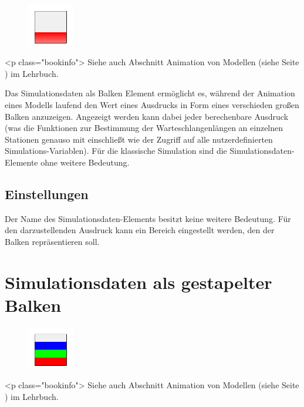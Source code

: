 \begin{figure}
\vspace{-22pt}
\includegraphics[width=2cm]{imageModelElementAnimationBar.png}
\vspace{-22pt}
\end{figure}

<p class="bookinfo">
Siehe auch Abschnitt Animation von Modellen (siehe Seite \pageref{ref:book:5.4.3}) im Lehrbuch.

Das Simulationsdaten als Balken Element ermöglicht es, während der Animation eines Modells laufend den Wert
eines Ausdrucks in Form eines verschieden großen Balken anzuzeigen. Angezeigt werden kann dabei jeder berechenbare
Ausdruck (was die Funktionen zur Bestimmung der Warteschlangenlängen an einzelnen Stationen genauso mit einschließt
wie der Zugriff auf alle nutzerdefinierten Simulations-Variablen). Für die klassische Simulation sind die
Simulationsdaten-Elemente ohne weitere Bedeutung.

\subsection*{Einstellungen}

Der Name des Simulationsdaten-Elements besitzt keine weitere Bedeutung. Für den darzustellenden Ausdruck kann
ein Bereich eingestellt werden, den der Balken repräsentieren soll.


\section{Simulationsdaten als gestapelter Balken}
\label{ref:ModelElementAnimationBarStack}

\begin{figure}
\vspace{-22pt}
\includegraphics[width=2cm]{imageModelElementAnimationBarStack.png}
\vspace{-22pt}
\end{figure}

<p class="bookinfo">
Siehe auch Abschnitt Animation von Modellen (siehe Seite \pageref{ref:book:5.4.3}) im Lehrbuch.


